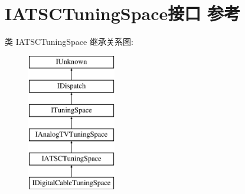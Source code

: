 \hypertarget{interface_i_a_t_s_c_tuning_space}{}\section{I\+A\+T\+S\+C\+Tuning\+Space接口 参考}
\label{interface_i_a_t_s_c_tuning_space}
类 I\+A\+T\+S\+C\+Tuning\+Space 继承关系图\+:\begin{figure}[H]
\begin{center}
\leavevmode
\includegraphics[height=6.000000cm]{interface_i_a_t_s_c_tuning_space}
\end{center}
\end{figure}
